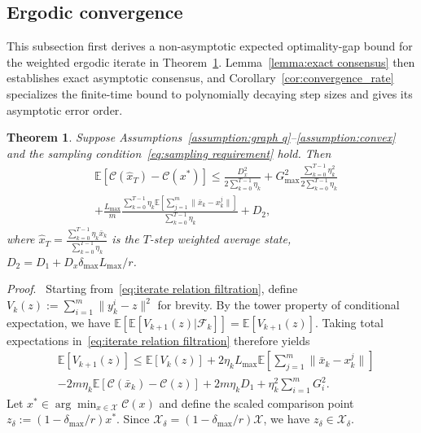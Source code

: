 \documentclass[twocolumn]{autart}    %
\newcommand{\brk}[1]{\left[#1\right]}
\newtheorem{theorem}{Theorem}
\newcommand{\1}{\mathbf{1}}
\begin{document}
\subsection{Ergodic convergence}\label{sec:ergodic}

This subsection first derives a non-asymptotic expected optimality-gap bound for the weighted ergodic iterate in 
Theorem~\ref{thm:ergodic}. 
Lemma~\ref{lemma:exact consensus} then establishes exact asymptotic consensus, 
and Corollary~\ref{cor:convergence_rate} specializes the finite-time bound to polynomially decaying step sizes 
and gives its asymptotic error order.
\begin{theorem} 
\label{thm:ergodic}
Suppose Assumptions~\ref{assumption:graph q}--\ref{assumption:convex} and the sampling condition~\eqref{eq:sampling requirement} hold. 
Then
\begin{align}\label{eq:sum c regret}
&\mathbb{E}\brk{\mathcal{C}(\hat{x}_T)- \mathcal{C}(x^\ast)}\le    \frac{D_x^2 }{2\sum_{k=0}^{T-1}\eta_{k}}+  G_{\max}^2\frac{\sum_{k=0}^{T-1}\eta_k^2}{2\sum_{k=0}^{T-1}\eta_{k}} \nonumber \\ 
&+ 
\frac{ L_{\max}}{m}\frac{\sum_{k=0}^{T-1}  \eta_k  \mathbb{E}\brk{\sum_{j=1}^{m}\|\bar{x}_k-x_k^j\|}}{\sum_{k=0}^{T-1}\eta_{k}} + 
 D_2  ,
\end{align}
where $\hat{x}_T = \frac{\sum_{k=0}^{T-1}\eta_k\bar{x}_k}{\sum_{k=0}^{T-1}\eta_k}$ is the $T$-step weighted average state, $D_2 = D_1 +   D_x\delta_{\max}L_{\max}/r $.  
\end{theorem}
\textit{Proof}.  \ 
Starting from~\eqref{eq:iterate relation filtration}, define $V_k(z):=\sum_{i=1}^m\|y_k^i-z\|^2$ for brevity.
By the tower property of conditional expectation, we have  $\mathbb{E}\left[ \mathbb{E}[ V_{k+1}(z)| \mathcal{F}_k] \right] =  \mathbb{E}\brk{ V_{k+1}(z)}$. 
Taking total expectations in~\eqref{eq:iterate relation filtration} therefore yields
\begin{align}\label{eq:iteration relation 0}
& \mathbb{E}\brk{V_{k+1}(z)  } \le   \mathbb{E}\brk{V_{k}(z) }+ 2\eta_kL_{\max}\mathbb{E}\brk{\sum_{j=1}^{m}\|\bar{x}_k-x_k^j\|} \nonumber \\ 
&-2m\eta_k\mathbb{E}\brk{\mathcal{C}(\bar{x}_k)-\mathcal{C}(z)}+  2m\eta_k D_1   
+\eta_k^{2}  \sum_{i=1}^m G_i^2.  
\end{align}
Let $x^\ast\in\arg\min_{x\in\mathcal X}\mathcal C(x)$ and define the scaled comparison point
$z_\delta:=\left(1-\delta_{\max}/r\right)x^\ast$.
Since $\mathcal X_\delta=\left(1-\delta_{\max}/r\right)\mathcal X$, we have $z_\delta\in\mathcal X_\delta$.
\end{document}

